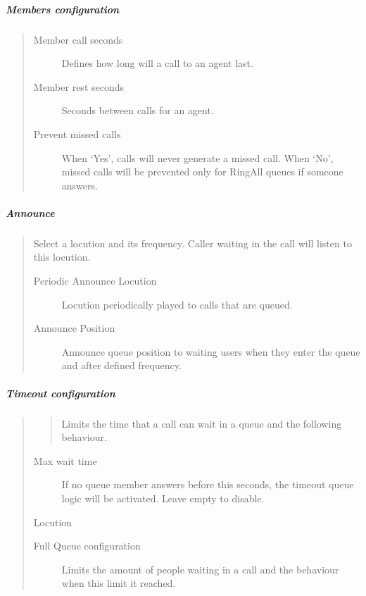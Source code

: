 \documentclass[letterpaper,10pt,spanish]{sphinxmanual}
\begin{document}
\subparagraph{Members configuration}
\label{administration_portal/client/vpbx/routing_endpoints/queues:members-configuration}\begin{quote}
\begin{description}
\item[{Member call seconds}] \leavevmode
Defines how long will a call to an agent last.

\item[{Member rest seconds}] \leavevmode
Seconds between calls for an agent.

\item[{Prevent missed calls}] \leavevmode
When `Yes', calls will never generate a missed call. When `No', missed calls will be prevented only for RingAll
queues if someone answers.

\end{description}
\end{quote}


\subparagraph{Announce}
\label{administration_portal/client/vpbx/routing_endpoints/queues:announce}\begin{quote}

Select a locution and its frequency. Caller waiting in the call will listen
to this locution.
\begin{description}
\item[{Periodic Announce Locution}] \leavevmode
Locution periodically played to calls that are queued.

\item[{Announce Position}] \leavevmode
Announce queue position to waiting users when they enter the queue and after
defined frequency.

\end{description}
\end{quote}


\subparagraph{Timeout configuration}
\label{administration_portal/client/vpbx/routing_endpoints/queues:timeout-configuration}\begin{quote}
\begin{quote}

Limits the time that a call can wait in a queue and the following behaviour.
\end{quote}
\begin{description}
\item[{Max wait time}] \leavevmode
If no queue member answers before this seconds, the timeout queue logic
will be activated. Leave empty to disable.

\end{description}

Locution
\begin{description}
\item[{Full Queue configuration}] \leavevmode
Limits the amount of people waiting in a call and the behaviour when this limit
it reached.

\end{description}
\end{quote}
\end{document}
